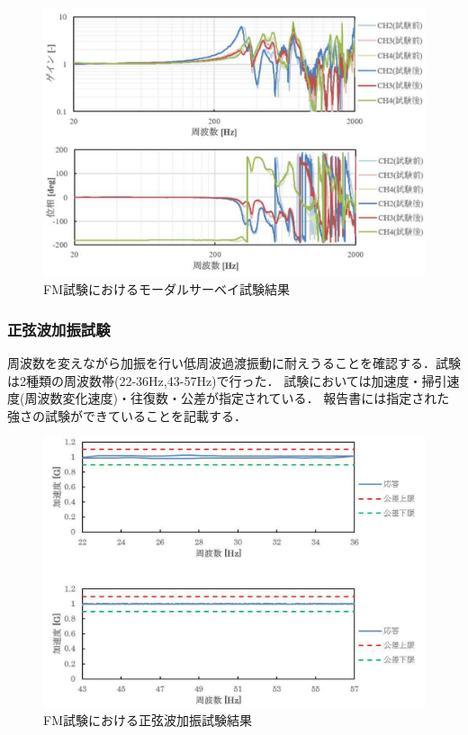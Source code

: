 \begin{figure}[H]
	\centering
	\includegraphics[width=1\linewidth]{04/fig/4-3-3.pdf}
	\caption{FM試験におけるモーダルサーベイ試験結果\cite{FM_vibration_test_report}}
	\label{fig4-3-1}
\end{figure}


\subsubsection{正弦波加振試験}
周波数を変えながら加振を行い低周波過渡振動に耐えうることを確認する．試験は2種類の周波数帯(22-36Hz,43-57Hz)で行った．
試験においては加速度・掃引速度(周波数変化速度)・往復数・公差が指定されている．
報告書には指定された強さの試験ができていることを記載する．

\begin{figure}[H]
	\centering
	\includegraphics[width=1\linewidth]{04/fig/4-3-4.pdf}
	\caption{FM試験における正弦波加振試験結果\cite{FM_vibration_test_report}}
	\label{fig4-3-1}
\end{figure}


